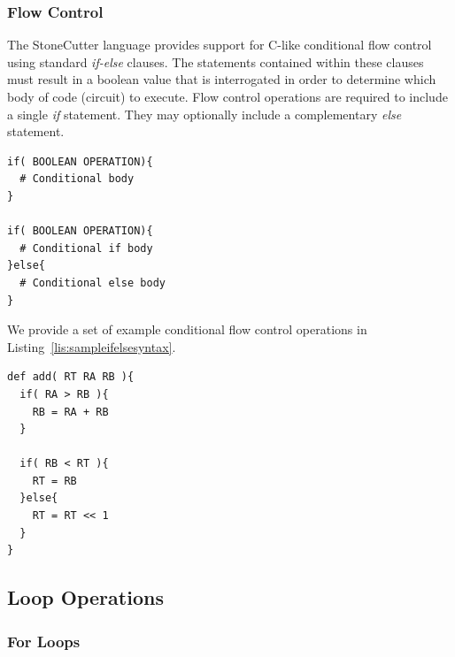 \documentclass{article}
\begin{document}
\clearpage
\subsubsection{Flow Control}
\label{sec:FlowControl}

The StoneCutter language provides support for C-like conditional flow 
control using standard \textit{if-else} clauses.  The statements contained 
within these clauses must result in a boolean value that is interrogated in order 
to determine which body of code (circuit) to execute.  Flow control operations 
are required to include a single \textit{if} statement.  They may optionally include 
a complementary \textit{else} statement.   

\vspace{0.125in}
\begin{lstlisting}[frame=single,style=base,caption={Flow Control Syntax},captionpos=b,label={lis:ifelsesyntax}]
if( BOOLEAN OPERATION){
  # Conditional body
}

if( BOOLEAN OPERATION){
  # Conditional if body
}else{
  # Conditional else body
}
\end{lstlisting}

We provide a set of example conditional flow control operations in Listing~\ref{lis:sampleifelsesyntax}.  

\vspace{0.125in}
\begin{lstlisting}[frame=single,style=base,caption={Sample If-Else Syntax},captionpos=b,label={lis:sampleifelsesyntax}]
def add( RT RA RB ){
  if( RA > RB ){
    RB = RA + RB
  }
  
  if( RB < RT ){
    RT = RB
  }else{
    RT = RT << 1
  }
}
\end{lstlisting}

\clearpage
\subsection{Loop Operations}
\label{sec:LoopOperations}

\subsubsection{For Loops}
\label{sec:ForLoops}
\end{document}
